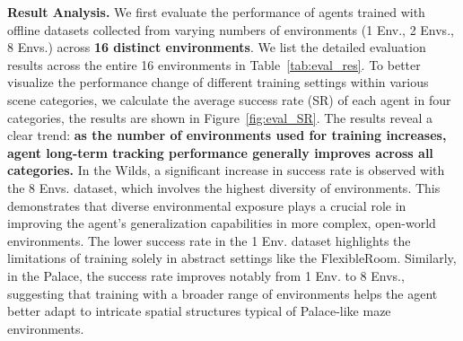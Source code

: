 \documentclass{article}
\begin{document}
\textbf{Result Analysis.}
We first evaluate the performance of agents trained with offline datasets collected from varying numbers of environments (1 Env., 2 Envs., 8 Envs.) across \textbf{16 distinct environments}. We list the detailed evaluation results across the entire 16 environments in Table~\ref{tab:eval_res}. To better visualize the performance change of different training settings within various scene categories, we calculate the average success rate (SR) of each agent in four categories, the results are shown in Figure~\ref{fig:eval_SR}. The results reveal a clear trend: \textbf{as the number of environments used for training increases, agent long-term tracking performance generally improves across all categories.} In the Wilds, a significant increase in success rate is observed with the 8 Envs. dataset, which involves the highest diversity of environments. This demonstrates that diverse environmental exposure plays a crucial role in improving the agent's generalization capabilities in more complex, open-world environments. The lower success rate in the 1 Env. dataset highlights the limitations of training solely in abstract settings like the FlexibleRoom. Similarly, in the Palace, the success rate improves notably from 1 Env. to 8 Envs., suggesting that training with a broader range of environments helps the agent better adapt to intricate spatial structures typical of Palace-like maze environments.
\end{document}
